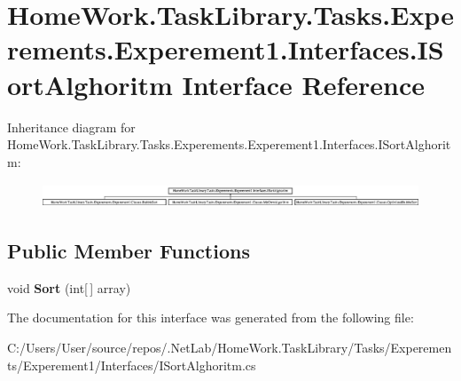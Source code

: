 \hypertarget{interface_home_work_1_1_task_library_1_1_tasks_1_1_experements_1_1_experement1_1_1_interfaces_1_1_i_sort_alghoritm}{}\section{Home\+Work.\+Task\+Library.\+Tasks.\+Experements.\+Experement1.\+Interfaces.\+I\+Sort\+Alghoritm Interface Reference}
\label{interface_home_work_1_1_task_library_1_1_tasks_1_1_experements_1_1_experement1_1_1_interfaces_1_1_i_sort_alghoritm}
Inheritance diagram for Home\+Work.\+Task\+Library.\+Tasks.\+Experements.\+Experement1.\+Interfaces.\+I\+Sort\+Alghoritm\+:\begin{figure}[H]
\begin{center}
\leavevmode
\includegraphics[height=0.732026cm]{interface_home_work_1_1_task_library_1_1_tasks_1_1_experements_1_1_experement1_1_1_interfaces_1_1_i_sort_alghoritm}
\end{center}
\end{figure}
\subsection*{Public Member Functions}
\begin{DoxyCompactItemize}
\item 
\mbox{\label{interface_home_work_1_1_task_library_1_1_tasks_1_1_experements_1_1_experement1_1_1_interfaces_1_1_i_sort_alghoritm_a02d474d36d75770e4d7816156b990dfb}} 
void {\bfseries Sort} (int\mbox{[}$\,$\mbox{]} array)
\end{DoxyCompactItemize}


The documentation for this interface was generated from the following file\+:\begin{DoxyCompactItemize}
\item 
C\+:/\+Users/\+User/source/repos/.\+Net\+Lab/\+Home\+Work.\+Task\+Library/\+Tasks/\+Experements/\+Experement1/\+Interfaces/I\+Sort\+Alghoritm.\+cs\end{DoxyCompactItemize}
